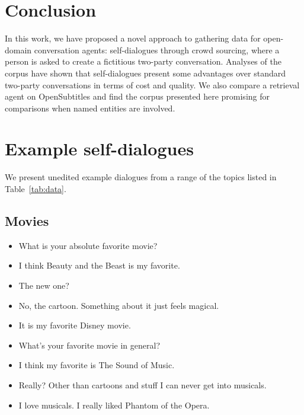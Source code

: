 \documentclass[11pt,a4paper]{article}
\begin{document}
\section{Conclusion}
In this work, we have proposed a novel approach to gathering data for open-domain conversation agents: self-dialogues through crowd sourcing, where a person is asked to create a fictitious two-party conversation. Analyses of the corpus have shown that self-dialogues present some advantages over standard two-party conversations in terms of cost and quality. We also compare a retrieval agent on OpenSubtitles and find the corpus presented here promising for comparisons when named entities are involved.




\appendix
\section{Example self-dialogues}
\label{sec:example_dialogues}
We present unedited example dialogues from a range of the topics listed in Table~\ref{tab:data}.
\subsection{Movies}
\begin{itemize}
\itemsep0em
\item[\ding{172}] What is your absolute favorite movie?
\item[\ding{173}] I think Beauty and the Beast is my favorite.
\item[\ding{172}] The new one?
\item[\ding{173}] No, the cartoon.  Something about it just feels magical.
\item[\ding{172}] It is my favorite Disney movie.
\item[\ding{173}] What's your favorite movie in general?
\item[\ding{172}] I think my favorite is The Sound of Music.
\item[\ding{173}] Really?  Other than cartoons and stuff I can never get into musicals.
\item[\ding{172}] I love musicals.  I really liked Phantom of the Opera.
\end{itemize}
\end{document}
